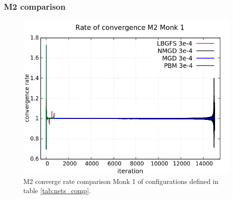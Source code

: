 \subsubsection{M2 comparison}
\begin{figure}[H]
	\centering
	\includegraphics[width=0.6\linewidth]{data/Comparison/Monk1/Monk1_M2_CR_standard.png}
	\caption{M2 converge rate comparison Monk 1 of configurations defined in table \ref{tab:nets_comp}.}
	\label{fig:CR-M2-Monk1-Standard}
\end{figure}

